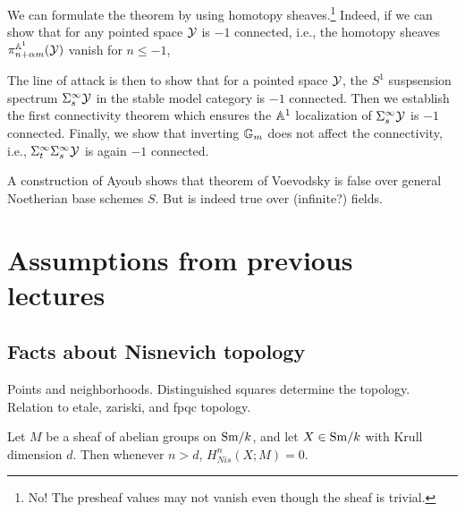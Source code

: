 \documentclass{amsart}%
\begin{document}
\begin{remark}
  We can formulate the theorem by using homotopy sheaves.\footnote{No! The presheaf values may not vanish even though the sheaf is trivial.} Indeed, if
  we can show that for any pointed space $\mathcal{Y}$ is $-1$ connected,
  i.e., the homotopy sheaves $\pi^{\mathbb{A}^1}_{n+\alpha m}(\mathcal{Y})$ vanish
  for $n\leq -1$, 


  The line of attack is then to show that for a pointed space $\mathcal{Y}$,
  the $S^1$ suspsension spectrum $\Sigma^{\infty}_s \mathcal{Y}$ in the
  stable model category is $-1$ connected. Then we establish the
  first connectivity theorem which ensures the $\mathbb{A}^1$ localization
  of $\Sigma^{\infty}_s\mathcal{Y}$ is $-1$ connected. Finally, we show that
  inverting $\mathbb{G}_m$ does not affect the connectivity, i.e.,
  $\Sigma^{\infty}_{t}\Sigma^{\infty}_s \mathcal{Y}$ is again $-1$ connected. 
\end{remark}

\begin{remark}
  A construction of Ayoub \cite{Ayoub} shows that theorem of Voevodsky
  is false over general Noetherian base schemes $S$. But is indeed
  true over (infinite?) fields.
\end{remark}

\section{Assumptions from previous lectures}

\subsection{Facts about Nisnevich topology}

Points and neighborhoods. Distinguished squares determine the
topology. Relation to etale, zariski, and fpqc topology. 

\begin{proposition}\cite[2.4.1]{Mor04}
  Let $M$ be a sheaf of abelian groups on $\mathrm{Sm}/k$, and let
  $X\in \mathrm{Sm}/k$ with Krull dimension $d$. Then whenever $n > d$,
  $H^n_{Nis}(X;M) = 0$.
\end{proposition}
\end{document}
